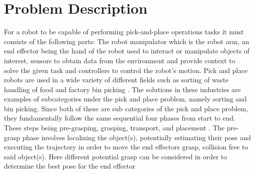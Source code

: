 \section{Problem Description}\label{sec:intro-problem-description}
For a robot to be capable of performing pick-and-place operations tasks it must consists of the following parts: The robot manipulator which is the robot arm, an end effector being the hand of the robot used to interact or manipulate objects of interest, sensors to obtain data from the environment and provide context to solve the given task and controllers to control the robot's motion.
Pick and place robots are used in a wide variety of different fields such as 
sorting of waste \cite*{robotic-pick-and-toss-facilitates-urban-waste-sorting}
handling of food \cite*{automation-of-mobile-pick-and-place-robotic-system-for-small-food-industry}\cite*{development-of-a-food-handling-soft-robot-hand-considering-a-high-speed-pick-and-place-task} and factory bin picking \cite*{real-time-industrial-bin-picking-with-a-hybrid-deep-learning-engineering-approach} \cite*{a-bin-picking-benchmark-for-systematic-evaluation-of-robotic-pick-and-place-systems} \cite{generic-development-of-bin-pick-and-place-system-based-on-robot-operating-system}. The solutions in these industries are examples of subcategories under the pick and place problem, namely sorting and bin picking. Since both of these are sub categories of the pick and place problem, they fundamentally follow the same sequential four phases from start to end. 
These steps being pre-grasping, grasping, transport, and placement \cite*{a-bin-picking-benchmark-for-systematic-evaluation-of-robotic-pick-and-place-systems}.
The pre-grasp phase involves localizing the object(s), potentially estimating their pose and executing the trajectory in order to move the end effectors grasp, collision free to said object(s). Here different potential grasp can be considered in order to determine the best pose for the end effector




